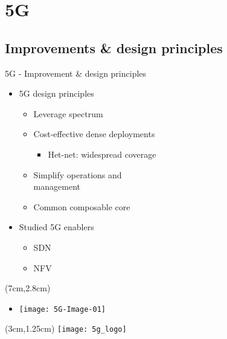 \section{5G}
\subsection*{Improvements \& design principles}
\begin{frame}{5G - Improvement \& design principles}

  \begin{itemize}
    \item[]<1-> 5G design principles
      \begin{itemize}
      \item<2-> Leverage spectrum
      \item<3-> Cost-effective dense deployments
        \begin{itemize}
        \item Het-net: widespread coverage
        \end{itemize}
      \item<4-> Simplify operations and \\ management
      \item<5-> Common composable core
      \end{itemize}
  \end{itemize}

  \begin{itemize}
    \item[]<6-> Studied 5G enablers
      \begin{itemize}
      \item<7-> SDN
      \item<8-> NFV
      \end{itemize}
  \end{itemize}


  \begin{textblock*}{5cm}(7cm,2.8cm)
    \begin{itemize}
      \item[]<6-> \texttt{[image: 5G-Image-01]}
    \end{itemize}
  \end{textblock*}

  \begin{textblock*}{5cm}(3cm,1.25cm)
    \texttt{[image: 5g\_logo]}
  \end{textblock*}
\end{frame}

